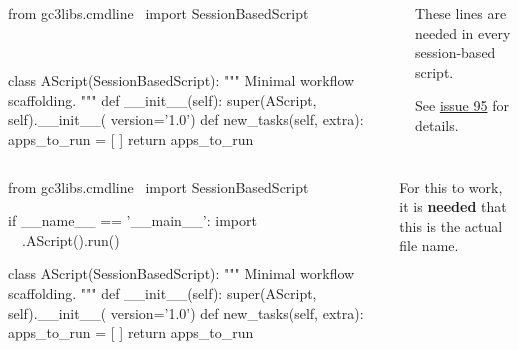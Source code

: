 \documentclass[english,serif,mathserif,xcolor=pdftex,dvipsnames,table]{beamer}
\begin{document}
\begin{frame}[fragile]
  \begin{columns}[t]
    \begin{column}{0.7\linewidth}
\begin{python}
from gc3libs.cmdline \
  import SessionBasedScript

~~
  ~~
  ~~

class AScript(SessionBasedScript):
  """
  Minimal workflow scaffolding.
  """
  def __init__(self):
    super(AScript, self).__init__(
        version='1.0')
  def new_tasks(self, extra):
    apps_to_run = [ ]
    return apps_to_run
\end{python}
    \end{column}
    \begin{column}{0.4\linewidth}
      \begin{flushright}
        These lines are needed in every session-based script.

        \+
        See \href{https://github.com/uzh/gc3pie/issues/95}{issue 95} for details.
      \end{flushright}
    \end{column}
  \end{columns}
\end{frame}


\begin{frame}[fragile]
  \begin{columns}[t]
    \begin{column}{0.7\linewidth}
\begin{python}
from gc3libs.cmdline \
  import SessionBasedScript

if __name__ == '__main__':
  import ~~
  ~\HL{ex10a}~.AScript().run()

class AScript(SessionBasedScript):
  """
  Minimal workflow scaffolding.
  """
  def __init__(self):
    super(AScript, self).__init__(
        version='1.0')
  def new_tasks(self, extra):
    apps_to_run = [ ]
    return apps_to_run
\end{python}
    \end{column}
    \begin{column}{0.4\linewidth}
      \begin{flushright}
        For this to work, it is \textbf{needed} that this is the
        actual file name.
      \end{flushright}
    \end{column}
  \end{columns}
\end{frame}
\end{document}
